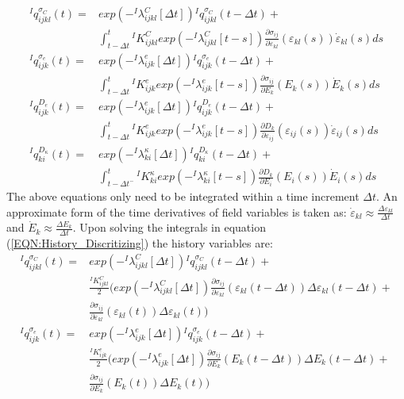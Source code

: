 \begin{equation}
\begin{aligned}
{}^{I}q_{ijkl}^{\sigma_C}(t)= 
&exp(-{}^{I}\lambda_{ijkl}^{C}[\Delta t]){}^{I}q_{ijkl}^{\sigma_C}(t-\Delta t)+ \\
&\int_{t-\Delta t}^{t}  
{}^{I}K_{ijkl}^{C}
exp(-{}^{I}\lambda_{ijkl}^{C}[t-s])\frac{\partial \sigma_{ij}}{\partial \varepsilon_{kl}} (\varepsilon_{kl}(s)) \dot{\varepsilon}_{kl}(s)ds \\
{}^{I}q_{ijk}^{\sigma_e}(t)=
&exp(-{}^{I}\lambda_{ijk}^{e}[\Delta t]) {}^{I}q_{ijk}^{\sigma_e}(t-\Delta t)+ \\
&\int_{t-\Delta t}^{t}  
{}^{I}K_{ijk}^{e} exp(-{}^{I}\lambda_{ijk}^{e}[t-s]) \frac{\partial \sigma_{ij}}{\partial E_{k}} (E_{k} (s)) \dot{E}_{k} (s)ds \\
{}^{I}q_{ijk}^{D_e}(t)=
&exp(-{}^{I}\lambda_{ijk}^{e}[\Delta t]){}^{I}q_{ijk}^{D_e}(t-\Delta t)+\\
&\int_{t-\Delta t}^t 
{}^{I}K_{ijk}^{e} exp(-{}^{I}\lambda_{ijk}^{e}[t-s]) \frac{\partial D_{k}}{\partial \varepsilon_{ij}}(\varepsilon_{ij}(s)) \dot{\varepsilon}_{ij}(s)ds\\
{}^{I}q_{ki}^{D_{\kappa}}(t)=
&exp(-{}^{I}\lambda_{ki}^{\kappa}[\Delta t]){}^{I}q_{ki}^{D_{\kappa}}(t-\Delta t)+\\
&\int_{t-\Delta t^-}^t  
{}^{I}K_{ki}^{\kappa}
exp(-{}^{I}\lambda_{ki}^{\kappa}[t-s]) \frac{\partial D_{k}}{\partial E_{i}} (E_{i} (s)) \dot{E}_{i} (s)ds
\end{aligned}
\label{EQN:History_Discritizing}
\end{equation}
The above equations only need to be integrated within a time increment $\Delta t$. 
An approximate form of the time derivatives of field variables is taken as: $\dot{\varepsilon}_{kl} \approx \frac{\Delta \varepsilon_{kl}}{\Delta t}$ and $\dot{E}_{k}\approx \frac{\Delta E_k}{\Delta t}$. 
Upon solving the integrals in equation (\ref{EQN:History_Discritizing}) the history variables are:
\begin{equation}
\begin{aligned}
{}^{I}q_{ijkl}^{\sigma_C}(t)=&
exp(-{}^{I}\lambda_{ijkl}^{C}[\Delta t]){}^{I}q_{ijkl}^{\sigma_C}(t-\Delta t)+ \\
& \frac{{}^{I}K_{ijkl}^{C}}{2} \Big(exp(-{}^{I}\lambda_{ijkl}^{C}[\Delta t])\frac{\partial \sigma_{ij}}{\partial \varepsilon_{kl}}(\varepsilon_{kl}(t-\Delta t)) \Delta\varepsilon_{kl}(t-\Delta t) + \\
& \frac{\partial \sigma_{ij}}{\partial \varepsilon_{kl}}(\varepsilon_{kl}(t)) \Delta \varepsilon_{kl}(t) \Big) \\
{}^{I}q_{ijk}^{\sigma_e}(t)=&
 exp(-{}^{I}\lambda_{ijk}^{e}[\Delta t]) {}^{I}q_{ijk}^{\sigma_e}(t-\Delta t)+ \\
& \frac{{}^{I}K_{ijk}^{e}}{2} \Big( exp(-{}^{I}\lambda_{ijk}^{e}[\Delta t]) \frac{\partial \sigma_{ij}}{\partial E_{k}}(E_{k} (t-\Delta t )) \Delta E_{k} (t-\Delta t ) + \\
& \frac{\partial \sigma_{ij}}{\partial E_{k}} (E_{k} (t)) \Delta E_{k} (t) \Big)\\
\end{aligned}
\label{EQN:History_Discritizing_Breaking_Integral_1_2}
\end{equation}
